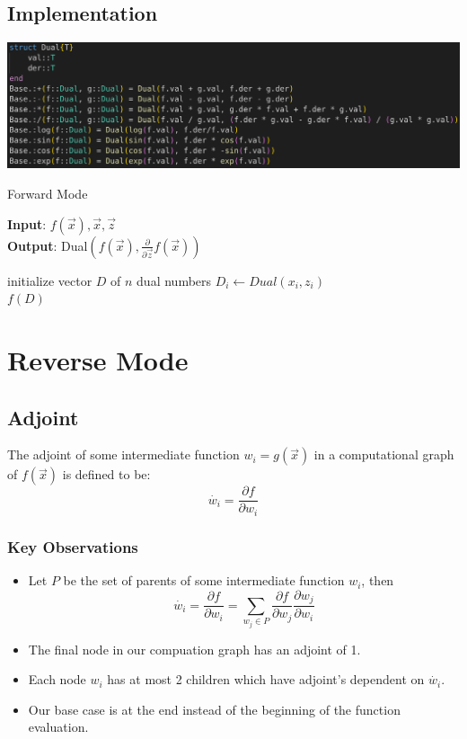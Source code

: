\documentclass[a0,landscape]{a0poster}
\begin{document}
\begin{multicols}{4}
\subsection*{Implementation}
\begin{center}
    \includegraphics[width=250mm]{figures/forward_mode.png}
\end{center}
\begin{algorithm}[H]
\caption{Forward Mode}
    \hspace*{\algorithmicindent} \textbf{Input}: $f(\vec{x}),\vec{x},\vec{z}$ \\
    \hspace*{\algorithmicindent} \textbf{Output}: Dual$\left(f(\vec{x}),\frac{\partial}{\partial\vec{z}}f(\vec{x})\right)$
\begin{algorithmic}[1]
\State initialize vector $D$ of $n$ dual numbers
        \State $D_i\gets Dual(x_i, z_i)$
    \EndFor\\
\Return $f(D)$
\end{algorithmic}
\end{algorithm}

\section*{Reverse Mode}

\subsection*{Adjoint}
The adjoint of some intermediate function $w_i=g(\vec{x})$ in a computational graph of $f(\vec{x})$ is defined to be:
$$\dot{w_i}=\frac{\partial f}{\partial w_i}$$

\subsubsection*{Key Observations}
\begin{itemize}
\item Let $P$ be the set of parents of some intermediate function $w_i$, then
    \begin{equation}
\dot{w_i}=\frac{\partial f}{\partial w_i}=\sum_{w_j\in P}{\frac{\partial f}{\partial w_j}\frac{\partial w_j}{\partial w_i}}
    \end{equation}
\item The final node in our compuation graph has an adjoint of 1.
\item Each node $w_i$ has at most 2 children which have adjoint's dependent on $\dot{w_i}$.
\item Our base case is at the end instead of the beginning of the function evaluation.
\end{itemize}


\end{multicols}
\end{document}
